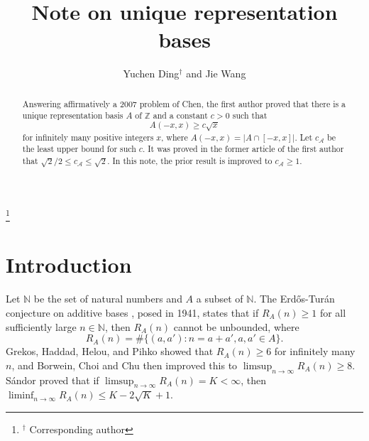 \documentclass[12pt,a4paper,reqno]{amsart}
\numberwithin{equation}{section}
\theoremstyle{plain}
\theoremstyle{definition}
\begin{document}
\title
[Note on unique representation bases]
{Note on unique representation bases}

\author
[Y. Ding and J. Wang] 
{Yuchen Ding$^\dag$ and Jie Wang}

\address{(Yuchen Ding$^{1,2}$) $^1$School of Mathematics,  Yangzhou University, Yangzhou 225002, People's Republic of China}
\address{$^2$HUN-REN Alfr\'ed R\'enyi Institute of Mathematics, Budapest, Pf. 127, H-1364 Hungary}

\address{(Jie Wang) School of Mathematical Sciences,  Yangzhou University, Yangzhou 225002, People's Republic of China}

\thanks{$^\dag$ Corresponding author}


\begin{abstract}
Answering affirmatively a 2007 problem of Chen, the first author proved that there is a unique representation basis $A$ of $\mathbb{Z}$ and a constant $c>0$ such that
$$
A(-x,x)\ge c\sqrt{x}
$$ 
for infinitely many positive integers $x$, where $A(-x,x)=\big|A\cap[-x, x]\big|$. Let $c_{\mathscr{A}}$ be the least upper bound for such $c$. It was proved in the former article of the first author that $\sqrt{2}/2\le c_{\mathscr{A}}\le \sqrt{2}$. In this note, the prior result is improved to $c_{\mathscr{A}}\ge 1$.

\end{abstract}
\maketitle

\section{Introduction}
Let $\mathbb{N}$ be the set of natural numbers and $A$ a subset of $\mathbb{N}$. 
The Erd\H os-Tur\'an conjecture on additive bases \cite{erdos-turan}, posed in 1941, states that if $R_A(n)\ge 1$ for all sufficiently large $n\in \mathbb{N}$, then $R_A(n)$ cannot be unbounded, where
$$
R_A(n)=\#\big\{(a,a'):n=a+a',a,a'\in A\big\}.
$$
Grekos, Haddad, Helou, and Pihko \cite{GHHP} showed that $R_A(n)\ge 6$ for infinitely many $n$, and Borwein, Choi and Chu \cite{BCC} then improved this to $\limsup_{n\rightarrow\infty}R_A(n)\ge 8$. S\'andor \cite{Sandor} proved that if $\limsup_{n\rightarrow\infty}R_A(n)=K<\infty$, then $\liminf_{n\rightarrow\infty}R_A(n)\le K-2\sqrt{K}+1$.
\end{document}
